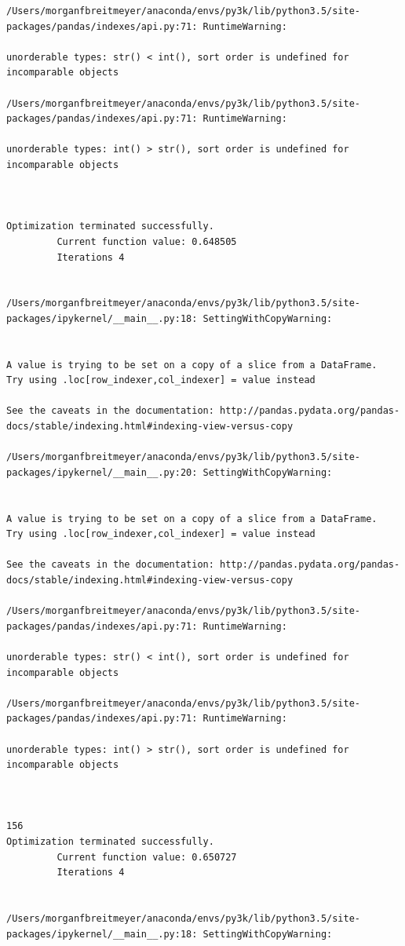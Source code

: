 \begin{lstlisting}
/Users/morganfbreitmeyer/anaconda/envs/py3k/lib/python3.5/site-packages/pandas/indexes/api.py:71: RuntimeWarning:

unorderable types: str() < int(), sort order is undefined for incomparable objects

/Users/morganfbreitmeyer/anaconda/envs/py3k/lib/python3.5/site-packages/pandas/indexes/api.py:71: RuntimeWarning:

unorderable types: int() > str(), sort order is undefined for incomparable objects



Optimization terminated successfully.
         Current function value: 0.648505
         Iterations 4


/Users/morganfbreitmeyer/anaconda/envs/py3k/lib/python3.5/site-packages/ipykernel/__main__.py:18: SettingWithCopyWarning:


A value is trying to be set on a copy of a slice from a DataFrame.
Try using .loc[row_indexer,col_indexer] = value instead

See the caveats in the documentation: http://pandas.pydata.org/pandas-docs/stable/indexing.html#indexing-view-versus-copy

/Users/morganfbreitmeyer/anaconda/envs/py3k/lib/python3.5/site-packages/ipykernel/__main__.py:20: SettingWithCopyWarning:


A value is trying to be set on a copy of a slice from a DataFrame.
Try using .loc[row_indexer,col_indexer] = value instead

See the caveats in the documentation: http://pandas.pydata.org/pandas-docs/stable/indexing.html#indexing-view-versus-copy

/Users/morganfbreitmeyer/anaconda/envs/py3k/lib/python3.5/site-packages/pandas/indexes/api.py:71: RuntimeWarning:

unorderable types: str() < int(), sort order is undefined for incomparable objects

/Users/morganfbreitmeyer/anaconda/envs/py3k/lib/python3.5/site-packages/pandas/indexes/api.py:71: RuntimeWarning:

unorderable types: int() > str(), sort order is undefined for incomparable objects



156
Optimization terminated successfully.
         Current function value: 0.650727
         Iterations 4


/Users/morganfbreitmeyer/anaconda/envs/py3k/lib/python3.5/site-packages/ipykernel/__main__.py:18: SettingWithCopyWarning:



\end{lstlisting}
